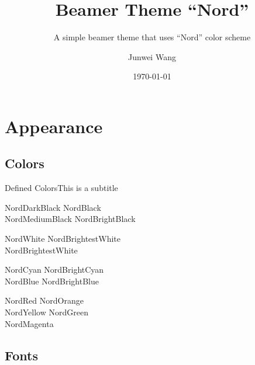 \documentclass[compress]{beamer}
\title{Beamer Theme ``Nord''}
\subtitle{A simple beamer theme that uses ``Nord'' color scheme}
\author{Junwei Wang}
\institute{CryptoExperts}
\date{\today}
\begin{document}
\begin{frame}
  \maketitle
\end{frame}


\section{Appearance}

\subsection{Colors}

\begin{frame}{Defined Colors}{This is a subtitle}
  \begin{description}
  \item[Polar Night]
    \textcolor{NordDarkBlack}{NordDarkBlack} \quad \textcolor{NordBlack}{NordBlack}\\
    \textcolor{NordMediumBlack}{NordMediumBlack} \quad \textcolor{NordBrightBlack}{NordBrightBlack}
  \item[Snow Storm]
    \textcolor{NordWhite}{NordWhite} \quad \textcolor{NordBrighterWhite}{NordBrightestWhite}\\
    \textcolor{NordBrightestWhite}{NordBrightestWhite}
  \item[Forest]
    \textcolor{NordCyan}{NordCyan} \quad \textcolor{NordBrightCyan}{NordBrightCyan}\\
    \textcolor{NordBlue}{NordBlue} \quad \textcolor{NordBrightBlue}{NordBrightBlue}
  \item[Aurora]
    \textcolor{NordRed}{NordRed} \quad \textcolor{NordOrange}{NordOrange} \\
    \textcolor{NordYellow}{NordYellow} \quad \textcolor{NordGreen}{NordGreen} \\
    \textcolor{NordMagenta}{NordMagenta}
  \end{description}
\end{frame}

\subsection{Fonts}
\end{document}
